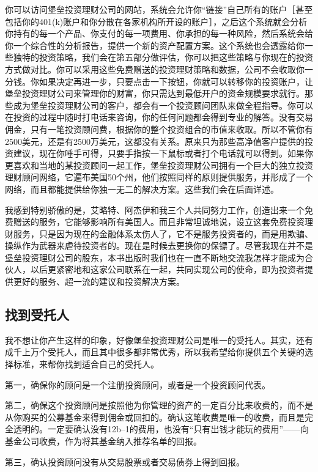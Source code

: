 你可以访问堡垒投资理财公司的网站，系统会允许你“链接”自己所有的账户［甚至包括你的401(k)账户和你分散在各家机构所开设的账户］，之后这个系统就会分析你持有的每一个产品、你支付的每一项费用、你承担的每一种风险，然后系统会给你一个综合性的分析报告，提供一个新的资产配置方案。这个系统也会透露给你一些独特的投资策略，我们会在第五部分做评估，你可以把这些策略与你现在的投资方式做对比。你可以采用这些免费赠送的投资理财策略和数据，公司不会收取你一分钱。你如果决定再进一步，只要点击一下按钮，你就可以转移你的投资账户，让堡垒投资理财公司来管理你的财富，你只需达到最低开户的资金规模要求就行。那些成为堡垒投资理财公司的客户，都会有一个投资顾问团队来做全程指导。你可以在投资的过程中随时打电话来咨询，你的任何问题都会得到专业的解答。没有交易佣金，只有一笔投资顾问费，根据你的整个投资组合的市值来收取。所以不管你有2500美元，还是有2500万美元，这都没有关系。原来只为那些高净值客户提供的投资建议，现在你唾手可得，只要手指按一下鼠标或者打个电话就可以得到。如果你更喜欢和当地的某投资顾问一起工作，堡垒投资理财公司拥有一个巨大的独立投资理财顾问网络，它遍布美国50个州，他们按照同样的原则提供服务，并形成了一个网络，而且都能提供给你独一无二的解决方案。这些我们会在后面详述。

我感到特别骄傲的是，艾略特、阿杰伊和我三个人共同努力工作，创造出来一个免费赠送的服务，它能够影响所有美国人。而且非常坦诚地说，设立这套免费投资理财服务，只是因为现在的金融体系太伤人了，它不是服务投资者的，而是用欺骗、操纵作为武器来虐待投资者的。现在是时候去更换你的保镖了。尽管我现在并不是堡垒投资理财公司的股东，本书出版时我们也在一直不断地交流我怎样才能成为合伙人，以后更紧密地和这家公司联系在一起，共同实现公司的使命，即为投资者提供更好的服务、超一流的建议和投资解决方案。

\subsection{找到受托人}

我不想让你产生这样的印象，好像堡垒投资理财公司是唯一的受托人。其实，还有成千上万个受托人，而且其中很多都非常优秀，所以我希望给你提供五个关键的选择标准，来帮你找到适合自己的受托人。

第一，确保你的顾问是一个注册投资顾问，或者是一个投资顾问代表。

第二，确保这个投资顾问是按照他为你管理的资产的一定百分比来收费的，而不是从你购买的公募基金来得到佣金或回扣的。确认这笔收费是唯一的收费，而且是完全透明的。一定要确认没有12b–1的费用，也没有“只有出钱才能玩的费用”——向基金公司收费，作为将其基金纳入推荐名单的回报。

第三，确认投资顾问没有从交易股票或者交易债券上得到回报。


